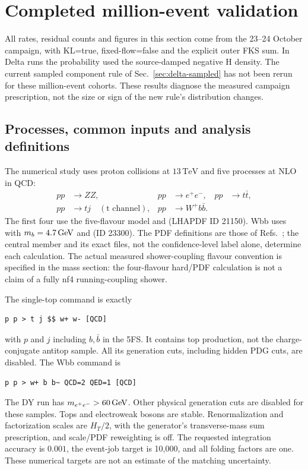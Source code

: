 \section{Completed million-event validation}
\label{sec:results}

All rates, residual counts and figures in this section come from the
23--24 October  campaign, with KL=true,
fixed-flow=false and the explicit outer FKS sum. In Delta runs the
probability used the source-damped negative H density. The current
sampled component rule of Sec.~\ref{sec:delta-sampled} has not been
rerun for these million-event cohorts. These results diagnose the
measured campaign prescription, not the size or sign of the new rule's
distribution changes.

\subsection{Processes, common inputs and analysis definitions}
The numerical study uses proton collisions at $13\,\mathrm{TeV}$ and
five processes at NLO in QCD:
\begin{align*}
 pp&\to ZZ, & pp&\to e^+e^-, & pp&\to t\bar t,\\
 pp&\to tj\quad(\text{t channel}), & pp&\to W^+b\bar b.
\end{align*}
The first four use the five-flavour model
 and
 (LHAPDF ID 21150).
Wbb uses  with $m_b=4.7\,\mathrm{GeV}$ and
 (ID 23300).
The PDF definitions are those of Refs.~\cite{MSTW,LHAPDF}; the central
member and its exact files, not the confidence-level label alone,
determine each calculation. The actual measured shower-coupling flavour
convention is specified in the mass section: the four-flavour hard/PDF
calculation is not a claim of a fully nf4 running-coupling shower.

The single-top command is exactly
\begin{lstlisting}
p p > t j $$ w+ w- [QCD]
\end{lstlisting}
with $p$ and $j$ including $b,\bar b$ in the 5FS. It contains top
production, not the charge-conjugate antitop sample. All its generation
cuts, including hidden PDG cuts, are disabled. The Wbb command is
\begin{lstlisting}
p p > w+ b b~ QCD=2 QED=1 [QCD]
\end{lstlisting}
The DY run has $m_{e^+e^-}>60\,\mathrm{GeV}$. Other physical generation cuts are
disabled for these samples. Tops and electroweak bosons are stable.
Renormalization and factorization scales are $H_T/2$, with the generator's
transverse-mass sum prescription, and scale/PDF reweighting is off.
The requested integration accuracy is $0.001$, the event-job target is
10,000, and all folding factors are one. These numerical targets are not
an estimate of the matching uncertainty.

